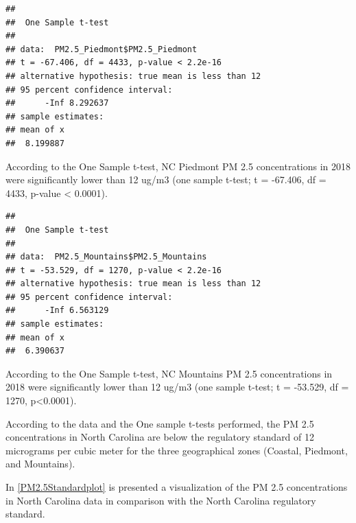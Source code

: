 \documentclass[12pt,]{article}
\newenvironment{Shaded}{\begin{snugshade}}{\end{snugshade}}
\newcommand{\KeywordTok}[1]{\textcolor[rgb]{0.13,0.29,0.53}{\textbf{#1}}}
\newcommand{\DataTypeTok}[1]{\textcolor[rgb]{0.13,0.29,0.53}{#1}}
\newcommand{\DecValTok}[1]{\textcolor[rgb]{0.00,0.00,0.81}{#1}}
\newcommand{\StringTok}[1]{\textcolor[rgb]{0.31,0.60,0.02}{#1}}
\newcommand{\OperatorTok}[1]{\textcolor[rgb]{0.81,0.36,0.00}{\textbf{#1}}}
\newcommand{\NormalTok}[1]{#1}
\begin{document}
\begin{Shaded}
\end{Shaded}

\begin{verbatim}
## 
##  One Sample t-test
## 
## data:  PM2.5_Piedmont$PM2.5_Piedmont
## t = -67.406, df = 4433, p-value < 2.2e-16
## alternative hypothesis: true mean is less than 12
## 95 percent confidence interval:
##      -Inf 8.292637
## sample estimates:
## mean of x 
##  8.199887
\end{verbatim}

According to the One Sample t-test, NC Piedmont PM 2.5 concentrations in
2018 were significantly lower than 12 ug/m3 (one sample t-test; t =
-67.406, df = 4433, p-value \textless{} 0.0001).

\begin{Shaded}
\end{Shaded}

\begin{verbatim}
## 
##  One Sample t-test
## 
## data:  PM2.5_Mountains$PM2.5_Mountains
## t = -53.529, df = 1270, p-value < 2.2e-16
## alternative hypothesis: true mean is less than 12
## 95 percent confidence interval:
##      -Inf 6.563129
## sample estimates:
## mean of x 
##  6.390637
\end{verbatim}

According to the One Sample t-test, NC Mountains PM 2.5 concentrations
in 2018 were significantly lower than 12 ug/m3 (one sample t-test; t =
-53.529, df = 1270, p\textless{}0.0001).

According to the data and the One sample t-tests performed, the PM 2.5
concentrations in North Carolina are below the regulatory standard of 12
micrograms per cubic meter for the three geographical zones (Coastal,
Piedmont, and Mountains).

In \autoref{PM2.5Standardplot} is presented a visualization of the PM
2.5 concentrations in North Carolina data in comparison with the North
Carolina regulatory standard.
\end{document}

